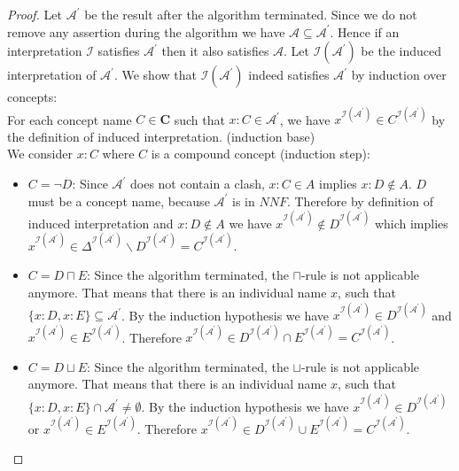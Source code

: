 \documentclass{book}
\theoremstyle{break}
\theoremstyle{definition}
\begin{document}
\begin{proof}
Let $\mathcal{A}^\prime$ be the result after the algorithm terminated. Since we do not remove any assertion during the algorithm we have $\mathcal{A}\subseteq\mathcal{A}^\prime$. Hence if an interpretation $\mathcal{I}$ satisfies $\mathcal{A}^\prime$ then it also satisfies $\mathcal{A}$. Let $\mathcal{I}(\mathcal{A}^\prime)$ be the induced interpretation of $\mathcal{A}^\prime$. We show that $\mathcal{I}(\mathcal{A}^\prime)$ indeed satisfies $\mathcal{A}^\prime$ by induction over concepts:\\
For each concept name $C\in\mathbf{C}$ such that $x:C\in\mathcal{A}^\prime$, we have $x^{\mathcal{I}(\mathcal{A}^\prime)}\in C^{\mathcal{I}(\mathcal{A}^\prime)}$ by the definition of induced interpretation. (induction base)\\
We consider $x:C$ where $C$ is a compound concept (induction step):
\begin{itemize}
\item $C=\neg D$: Since $\mathcal{A}^\prime$ does not contain a clash, $x:C\in A$ implies $x:D\notin A$. $D$ must be a concept name, because $\mathcal{A}^\prime$ is in $NNF$. Therefore by definition of induced interpretation and $x:D\notin A$ we have $x^{\mathcal{I}(\mathcal{A}^\prime)}\notin D^{\mathcal{I}(\mathcal{A}^\prime)}$ which implies $x^{\mathcal{I}(\mathcal{A}^\prime)}\in \Delta^{\mathcal{I}(\mathcal{A}^\prime)}\backslash D^{\mathcal{I}(\mathcal{A}^\prime)}=C^{\mathcal{I}(\mathcal{A}^\prime)}$.
\item $C=D\sqcap E$: Since the algorithm terminated, the $\sqcap$-rule is not applicable anymore. That means that there is an individual name $x$, such that $\{x:D, x:E\}\subseteq \mathcal{A}^\prime$. By the induction hypothesis we have $x^{\mathcal{I}(\mathcal{A}^\prime)}\in D^{\mathcal{I}(\mathcal{A}^\prime)}$ and $x^{\mathcal{I}(\mathcal{A}^\prime)}\in E^{\mathcal{I}(\mathcal{A}^\prime)}$. Therefore $x^{\mathcal{I}(\mathcal{A}^\prime)}\in D^{\mathcal{I}(\mathcal{A}^\prime)}\cap E^{\mathcal{I}(\mathcal{A}^\prime)}=C^{\mathcal{I}(\mathcal{A}^\prime)}$.
\item $C=D\sqcup E$: Since the algorithm terminated, the $\sqcup$-rule is not applicable anymore. That means that there is an individual name $x$, such that $\{x:D, x:E\}\cap \mathcal{A}^\prime\neq \emptyset$. By the induction hypothesis we have $x^{\mathcal{I}(\mathcal{A}^\prime)}\in D^{\mathcal{I}(\mathcal{A}^\prime)}$ or $x^{\mathcal{I}(\mathcal{A}^\prime)}\in E^{\mathcal{I}(\mathcal{A}^\prime)}$. Therefore $x^{\mathcal{I}(\mathcal{A}^\prime)}\in D^{\mathcal{I}(\mathcal{A}^\prime)}\cup E^{\mathcal{I}(\mathcal{A}^\prime)}=C^{\mathcal{I}(\mathcal{A}^\prime)}$.

\end{itemize}
\end{proof}
\end{document}
